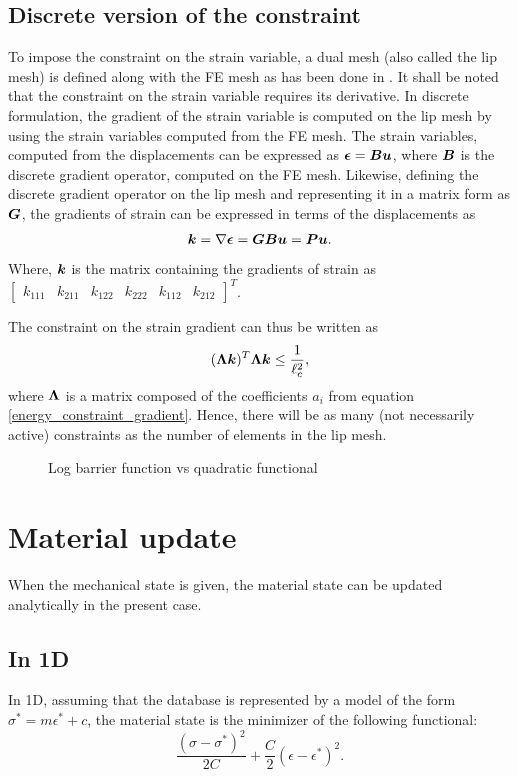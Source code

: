 \documentclass[10pt]{elsarticle}
\begin{document}
\subsection{Discrete version of the constraint}
To impose the constraint on the strain variable, a dual mesh (also called the lip mesh) is defined along with the FE mesh as has been done in \cite{Moes and Chevaugeon}. It shall be noted that the constraint on the strain variable requires its derivative. In discrete formulation, the gradient of the strain variable is computed on the lip mesh by using the strain variables computed from the FE mesh. The strain variables, computed from the displacements can be expressed as $\mbox{\boldmath $\epsilon$} = \mbox{\boldmath $B$} \mbox{\boldmath $u$}$, where $\mbox{\boldmath $B$}$ is the discrete gradient operator, computed on the FE mesh. Likewise, defining the discrete gradient operator on the lip mesh and representing it in a matrix form as $\mbox{\boldmath $G$}$, the gradients of strain can be expressed in terms of the displacements as 
\begin{equation}
	\mbox{\boldmath $k$} = \nabla \mbox{\boldmath $\epsilon$} = \mbox{\boldmath $G$} \mbox{\boldmath $B$} \mbox{\boldmath $u$} = \mbox{\boldmath $P$} \mbox{\boldmath $u$}.
\end{equation}
Where, $\mbox{\boldmath $k$}$ is the matrix containing the gradients of strain as $\begin{bmatrix}
	k_{111} & k_{211} & k_{122} & k_{222} & k_{112} & k_{212}
\end{bmatrix}^T$.

The constraint on the strain gradient can thus be written as 
\begin{equation} \label{discrete_constraint}
	(\mbox{\boldmath $\Lambda$} \mbox{\boldmath $k$} )^T \mbox{\boldmath $\Lambda$} \mbox{\boldmath $k$} \leq \frac{1}{\ell_c^2},
\end{equation}
where $\mbox{\boldmath $\Lambda$}$ is a matrix composed of the coefficients $a_i$ from equation \ref{energy_constraint_gradient}. Hence, there will be as many (not necessarily active) constraints as the number of elements in the lip mesh.

\begin{figure}[ht]
	\centering
	
	\caption{Log barrier function vs quadratic functional}
	\label{comparison_log_quadratic}
\end{figure}


\section{Material update}
When the mechanical state is given, the material state can be updated analytically in the present case. 
\subsection*{In 1D}
In 1D, assuming that the database is represented by a model of the form $\sigma^* = m \epsilon ^*+c$, the material state is the minimizer of the following functional:
\begin{equation}
	\frac{(\sigma - \sigma^*)^2}{2C} + \frac{C}{2}(\epsilon - \epsilon^*)^2.	 
\end{equation}
\end{document}
